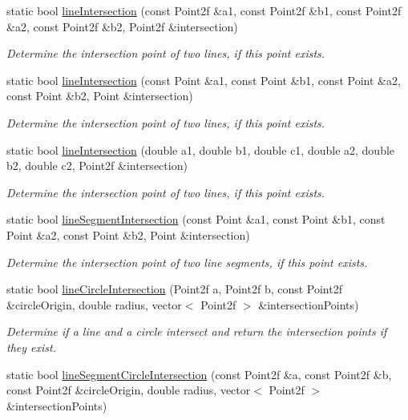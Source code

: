 \begin{DoxyCompactItemize}
static bool \hyperlink{classmultiscale_1_1Geometry2D_aae24e97b32bdd8dab88c880d0d25ec86}{line\-Intersection} (const Point2f \&a1, const Point2f \&b1, const Point2f \&a2, const Point2f \&b2, Point2f \&intersection)
\begin{DoxyCompactList}\small\item\em Determine the intersection point of two lines, if this point exists. \end{DoxyCompactList}\item 
static bool \hyperlink{classmultiscale_1_1Geometry2D_aa9d9b17a7e5098c8bde0cd9d3dc08dc2}{line\-Intersection} (const Point \&a1, const Point \&b1, const Point \&a2, const Point \&b2, Point \&intersection)
\begin{DoxyCompactList}\small\item\em Determine the intersection point of two lines, if this point exists. \end{DoxyCompactList}\item 
static bool \hyperlink{classmultiscale_1_1Geometry2D_a51a867b90c8492ce4ce85c227788678b}{line\-Intersection} (double a1, double b1, double c1, double a2, double b2, double c2, Point2f \&intersection)
\begin{DoxyCompactList}\small\item\em Determine the intersection point of two lines, if this point exists. \end{DoxyCompactList}\item 
static bool \hyperlink{classmultiscale_1_1Geometry2D_a9931c3d8089d658186a8c1ac78db5773}{line\-Segment\-Intersection} (const Point \&a1, const Point \&b1, const Point \&a2, const Point \&b2, Point \&intersection)
\begin{DoxyCompactList}\small\item\em Determine the intersection point of two line segments, if this point exists. \end{DoxyCompactList}\item 
static bool \hyperlink{classmultiscale_1_1Geometry2D_ab04c08f83d066f0d936d516d015ea62c}{line\-Circle\-Intersection} (Point2f a, Point2f b, const Point2f \&circle\-Origin, double radius, vector$<$ Point2f $>$ \&intersection\-Points)
\begin{DoxyCompactList}\small\item\em Determine if a line and a circle intersect and return the intersection points if they exist. \end{DoxyCompactList}\item 
static bool \hyperlink{classmultiscale_1_1Geometry2D_a92bd36cdda4cdacb4101c6db54474a6d}{line\-Segment\-Circle\-Intersection} (const Point2f \&a, const Point2f \&b, const Point2f \&circle\-Origin, double radius, vector$<$ Point2f $>$ \&intersection\-Points)

\end{DoxyCompactItemize}
